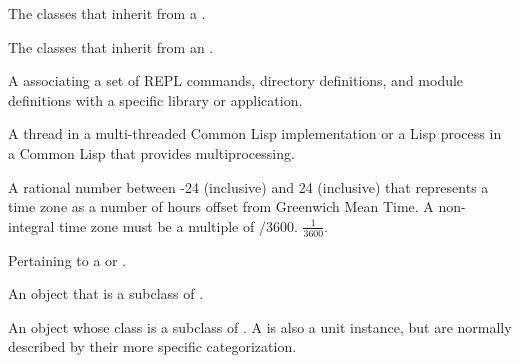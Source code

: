 \begin{glossary-list}
\glent[subclasses]
%
%
%
The classes that inherit from a .


\glent[subevents]
%
%
The classes that inherit from an .


%
%
A  associating a set of REPL commands, directory
definitions, and module definitions with a specific library or application.


\glent[thread] 
%
%
%
A thread in a multi-threaded Common Lisp implementation or a Lisp process in a
Common Lisp that provides multiprocessing.


%
%
A rational number between -24 (inclusive) and 24 (inclusive) that represents a
time zone as a number of hours offset from Greenwich Mean Time. A non-integral
time zone must be a multiple of 
%
/3600.  
\T$\frac{1}{3600}$.


\glent[unit]
%
%
%
%
%
Pertaining to a  or .


%
%
%
%
%
%
%
An object that is a subclass of \textbf{}.


%
%
%
%
%
%
%
%
An object whose class is a subclass of
\textbf{}. A  is
also a unit instance, but  are normally described by
their more specific categorization.


\end{glossary-list}
